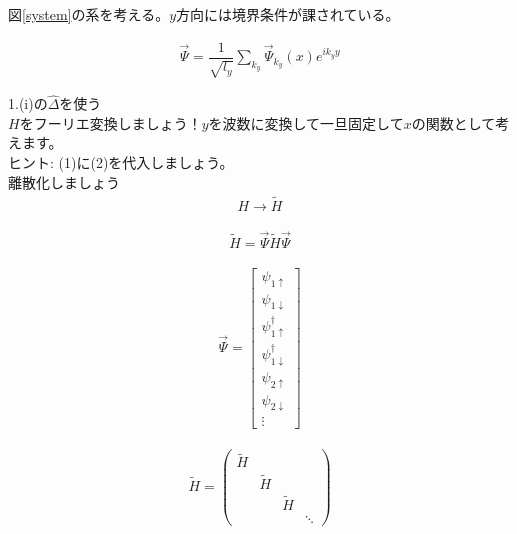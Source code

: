 \documentclass{jarticle}
\begin{document}
図\ref{system}の系を考える。$y$方向には境界条件が課されている。

\begin{align}
 \vec{\Psi}=\dfrac{1}{\sqrt{l_y}}\displaystyle\sum_{k_y}\vec{\Psi}_{k_y}(x)e^{ik_yy}
\end{align}

1.(i)の$\hat{\Delta}$を使う\\
$H$をフーリエ変換しましょう！$y$を波数に変換して一旦固定して$x$の関数として考えます。
\\ ヒント: (1)に(2)を代入しましょう。\\
離散化しましょう\\


\begin{align}
 H\rightarrow \tilde{H}
\end{align}

\begin{align}
  \tilde{H}=\vec{\Psi}\tilde{H}\vec{\Psi}
\end{align}

 \begin{align}
  \vec{\Psi}=\begin{bmatrix}
  \psi_{1\uparrow} \\
  \psi_{1\downarrow} \\
  \psi_{1\uparrow}^\dagger \\
  \psi_{1\downarrow}^\dagger\\
  \psi_{2\uparrow} \\
  \psi_{2\downarrow} \\
  \vdots
 \end{bmatrix}
\end{align}

\begin{align}
\tilde{H}=
\begin{pmatrix}
\tilde{H} &  &  &  \\
& \tilde{H} &  &  \\
&  & \tilde{H} &  \\
&  &  & \ddots
\end{pmatrix}
\end{align}
\end{document}
